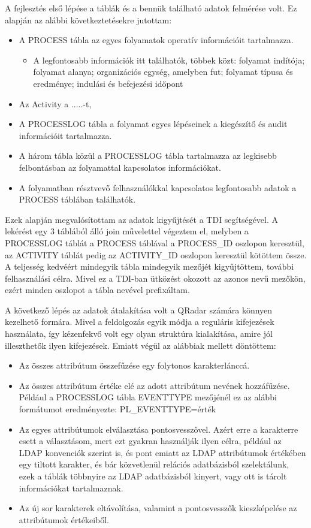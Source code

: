 A fejlesztés első lépése a táblák és a bennük található adatok felmérése volt. Ez alapján az alábbi következtetésekre jutottam:

\begin{itemize}
	\item A PROCESS tábla az egyes folyamatok operatív információit tartalmazza. 
	\begin{itemize}
		\item A legfontosabb információk itt találhatók, többek közt: folyamat indítója; folyamat alanya; organizációs egység, amelyben fut; folyamat típusa és eredménye; indulási és befejezési időpont
	\end{itemize}
	\item Az Activity a .....-t, 
	\item A PROCESSLOG tábla a folyamat egyes lépéseinek a kiegészítő és audit információit tartalmazza.
	\item A három tábla közül a PROCESSLOG tábla tartalmazza az legkisebb felbontásban az folyamattal kapcsolatos információkat.
	\item A folyamatban résztvevő felhasználókkal kapcsolatos legfontosabb adatok a PROCESS táblában találhatók.
\end{itemize}

Ezek alapján megvalósítottam az adatok kigyűjtését a TDI segítségével. A lekérést egy 3 táblából álló join művelettel végeztem el, melyben a PROCESSLOG táblát a PROCESS táblával a PROCESS\_ID oszlopon keresztül, az ACTIVITY táblát pedig az ACTIVITY\_ID oszlopon keresztül kötöttem össze. A teljesség kedvéért mindegyik tábla mindegyik mezőjét kigyűjtöttem, további felhasználási célra. Mivel ez a TDI-ban ütközést okozott az azonos nevű mezőkön, ezért minden oszlopot a tábla nevével prefixáltam.

A következő lépés az adatok átalakítása volt a QRadar számára könnyen kezelhető formára. Mivel a feldolgozás egyik módja a reguláris kifejezések használata, így kézenfekvő volt egy olyan struktúra kialakítása, amire jól illeszthetők ilyen kifejezések. Emiatt végül az alábbiak mellett döntöttem:

\begin{itemize}
	\item Az összes attribútum összefűzése egy folytonos karakterlánccá.
	\item Az összes attribútum értéke elé az adott attribútum nevének hozzáfűzése. Például a PROCESSLOG tábla EVENTTYPE mezőjénél ez az alábbi formátumot eredményezte: PL\_EVENTTYPE={érték}
	\item Az egyes attribútumok elválasztása pontosvesszővel. Azért erre a karakterre esett a választásom, mert ezt gyakran használják ilyen célra, például az LDAP konvenciók szerint is, és pont emiatt az LDAP attribútumok értékében egy tiltott karakter, és bár közvetlenül relációs adatbázisból szelektálunk, ezek a táblák többnyire az LDAP adatbázisból kinyert, vagy ott is tárolt információkat tartalmaznak.
	\item Az új sor karakterek eltávolítása, valamint a pontosvesszők \todo kieszképelése az attribútumok értékeiből.
\end{itemize} 

